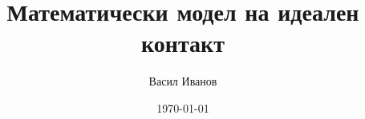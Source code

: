 \documentclass[12pt]{article}
\title{Математически модел на идеален контакт}
\author{Васил Иванов}
\date{\today}
\begin{document}




\nocite{repo}
\printbibliography
\end{document}

